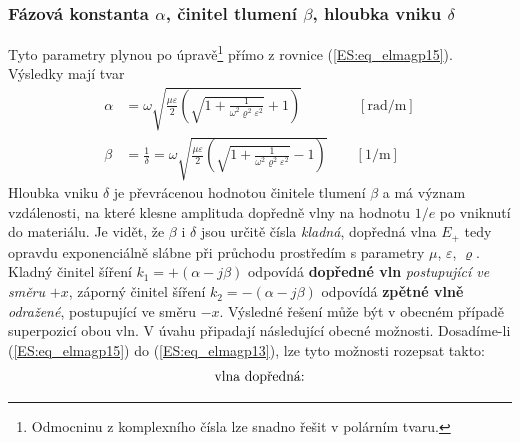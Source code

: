 {      \subsubsection{Fázová konstanta \(\alpha\), činitel tlumení \(\beta\), hloubka vniku 
                      \(\delta\)}
        Tyto parametry plynou po úpravě\footnote{Odmocninu z komplexního čísla lze snadno řešit v 
        polárním tvaru.} přímo z rovnice (\ref{ES:eq_elmagp15}). Výsledky mají tvar
        \begin{subequations}
          \begin{align}
            \alpha &= \omega\sqrt{
                              \frac{\mu\varepsilon}{2}
                                \left(
                                  \sqrt{1+\frac{1}{\omega^2\varrho^2\varepsilon^2}} +1 
                                \right)}                
                      \qquad\qquad [\si{\radian/\meter}]  \label{ES:eq_elmagp16a}  \\
            \beta  &= \frac{1}{\delta} 
                    = \omega\sqrt{
                              \frac{\mu\varepsilon}{2}
                                \left(
                                  \sqrt{1+\frac{1}{\omega^2\varrho^2\varepsilon^2}} -1
                                \right)}               
                      \qquad [\si{1/\meter}]               \label{ES:eq_elmagp16b}
          \end{align}
        \end{subequations}
        Hloubka vniku \(\delta\) je převrácenou hodnotou činitele tlumení \(\beta\) a má význam 
        vzdálenosti, na které klesne amplituda dopředně vlny na hodnotu \(1/e\) po vniknutí do 
        materiálu. Je vidět, že \(\beta\) i \(\delta\) jsou určitě čísla \emph{kladná}, dopředná 
        vlna \(E_+\) tedy opravdu exponenciálně slábne při průchodu prostředím s parametry \(\mu\), 
        \(\varepsilon\), \(\varrho\). Kladný činitel šíření \(k_1=+(\alpha-j\beta)\) odpovídá 
        \textbf{dopředné vln} \emph{postupující ve směru} \(+x\), záporný činitel šíření 
        \(k_2=-(\alpha-j\beta)\) odpovídá \textbf{zpětné vlně} \emph{odražené}, postupující ve 
        směru \(-x\). Výsledné řešení může být v obecném případě superpozicí obou vln. V úvahu 
        připadají následující obecné možnosti. Dosadíme-li (\ref{ES:eq_elmagp15}) do 
        (\ref{ES:eq_elmagp13}), lze tyto možnosti rozepsat takto:
        \begin{subequations}
          \begin{align}
            \shortintertext{vlna dopředná:}

\end{align}
\end{subequations}}
